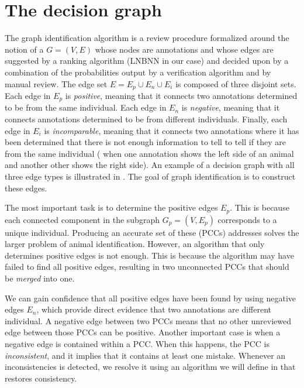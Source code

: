 \section{The decision graph}\label{sec:decisiongraph}

\decisiongraph{}

The graph identification algorithm is a review procedure formalized around the notion of a  $G = (V, E)$ whose nodes are annotations and whose edges are suggested by a ranking algorithm (LNBNN in our
case) and decided upon by a combination of the probabilities output by a verification algorithm and by manual
review.  The edge set $E = E_p \cup E_n \cup E_i$ is composed of three disjoint sets. Each edge in $E_p$ is
\emph{positive}, meaning that it connects two annotations determined to be from the same individual. Each edge in
$E_n$ is \emph{negative}, meaning that it connects annotations determined to be from different individuals.
Finally, each edge in $E_i$ is \emph{incomparable}, meaning that it connects two annotations where it has been
determined that there is not enough information to tell to tell if they are from the same individual (\eg{} when
one annotation shows the left side of an animal and another other shows the right side).  An example of a decision
graph with all three edge types is illustrated in . The goal of graph identification is to
construct these edges.

The most important task is to determine the positive edges $E_p$.  This is because each connected component in the
subgraph $G_p = (V, E_p)$ corresponds to a unique individual.  Producing an accurate set of these
 (PCCs) addresses solves the larger problem of animal identification.
However, an algorithm that only determines positive edges is not enough.  This is because the algorithm may have
failed to find all positive edges, resulting in two unconnected PCCs that should be \emph{merged} into one.

We can gain confidence that all positive edges have been found by using negative edges $E_n$, which provide direct
evidence that two annotations are different individual.  A negative edge between two PCCs means that no other
unreviewed edge between those PCCs can be positive.  Another important case is when a negative edge is contained
within a PCC. When this happens, the PCC is \emph{inconsistent}, and it implies that it contains at least one
mistake. Whenever an inconsistencies is detected, we resolve it using an algorithm we will define in
 that restores consistency.

